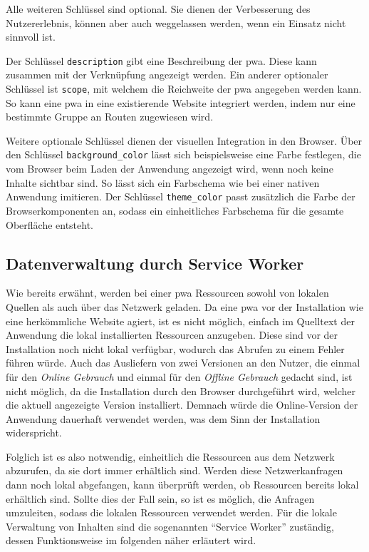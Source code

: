 \documentclass[12pt, parskip=half]{scrartcl}       %
\begin{document}
Alle weiteren Schlüssel sind optional.
Sie dienen der Verbesserung des Nutzererlebnis, können aber auch weggelassen werden, wenn ein Einsatz nicht sinnvoll ist.

Der Schlüssel \texttt{description} gibt eine Beschreibung der \ac{pwa}.
Diese kann zusammen mit der Verknüpfung angezeigt werden.
Ein anderer optionaler Schlüssel ist \texttt{scope}, mit welchem die Reichweite der \ac{pwa} angegeben werden kann.
So kann eine \ac{pwa} in eine existierende Website integriert werden, indem nur eine bestimmte Gruppe an Routen zugewiesen wird\cite{webdev_addmanifest}.

Weitere optionale Schlüssel dienen der visuellen Integration in den Browser.
Über den Schlüssel \texttt{background\_color} lässt sich beispielsweise eine Farbe festlegen, die vom Browser beim Laden der Anwendung angezeigt wird, wenn noch keine Inhalte sichtbar sind.
So lässt sich ein Farbschema wie bei einer nativen Anwendung imitieren.
Der Schlüssel \texttt{theme\_color} passt zusätzlich die Farbe der Browserkomponenten an, sodass ein einheitliches Farbschema für die gesamte Oberfläche entsteht.



\subsection{Datenverwaltung durch Service Worker}

Wie bereits erwähnt, werden bei einer \ac{pwa} Ressourcen sowohl von lokalen Quellen als auch über das Netzwerk geladen.
Da eine \ac{pwa} vor der Installation wie eine herkömmliche Website agiert, ist es nicht möglich, einfach im Quelltext der Anwendung die lokal installierten Ressourcen anzugeben.
Diese sind vor der Installation noch nicht lokal verfügbar, wodurch das Abrufen zu einem Fehler führen würde.
Auch das Ausliefern von zwei Versionen an den Nutzer, die einmal für den \textit{Online Gebrauch} und einmal für den \textit{Offline Gebrauch} gedacht sind, ist nicht möglich, da die Installation durch den Browser durchgeführt wird, welcher die aktuell angezeigte Version installiert.
Demnach würde die Online-Version der Anwendung dauerhaft verwendet werden, was dem Sinn der Installation widerspricht.

Folglich ist es also notwendig, einheitlich die Ressourcen aus dem Netzwerk abzurufen, da sie dort immer erhältlich sind.
Werden diese Netzwerkanfragen dann noch lokal abgefangen, kann überprüft werden, ob Ressourcen bereits lokal erhältlich sind.
Sollte dies der Fall sein, so ist es möglich, die Anfragen umzuleiten, sodass die lokalen Ressourcen verwendet werden.
Für die lokale Verwaltung von Inhalten sind die sogenannten \enquote{Service Worker} zuständig, dessen Funktionsweise im folgenden näher erläutert wird.
\end{document}

